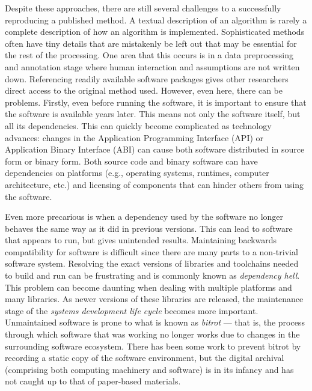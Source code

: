 Despite these approaches, there are still several challenges to a successfully
reproducing a published method.
{ %
	A textual description of an algorithm is rarely a complete description of
	how an algorithm is implemented. Sophisticated methods often have tiny details
	that are mistakenly be left out that may be essential for the rest of the
	processing. One area that this occurs is in a data preprocessing and annotation
	stage where human interaction and assumptions are not written down.
}
{ %
	Referencing readily available software packages gives
	other researchers direct access to the original method
	used. However, even here, there can be problems. Firstly,
	even before running the software, it is important to
	ensure that the
	software is available years later. This means not only the software itself, but
	all its dependencies. This can quickly become complicated as technology
	advances: changes in the Application Programming Interface (API) or Application
	Binary Interface (ABI) can cause both software distributed in source form or
	binary form. Both source code and binary software can have
	dependencies on platforms (e.g., operating systems,
	runtimes, computer architecture, etc.) and licensing of
	components that can hinder others from using the software.
}

{ %
	Even more precarious is when a dependency used by the
	software no longer behaves the same way as it did in
	previous versions. This can lead to software that appears
	to run, but gives unintended results.  Maintaining
	backwards compatibility for software is difficult since
	there are many parts to a non-trivial software system.
	Resolving the exact versions of libraries and toolchains
	needed to build and run can be frustrating and is commonly
	known as \emph{dependency hell}. This problem can become
	daunting when dealing with multiple platforms and many
	libraries. As newer versions of these libraries are
	released, the maintenance stage of the \emph{systems
	development life cycle} becomes more important.
	Unmaintained software is prone to what is known as
	\emph{bitrot} --- that is, the process through which
	software that was working no longer works due to changes
	in the surrounding software ecosystem.
	There has been some work to prevent bitrot by recording a
	static copy of the software environment, but the digital
	archival (comprising both computing machinery and
	software) is in its infancy and has not caught up to that
	of paper-based materials.
}


